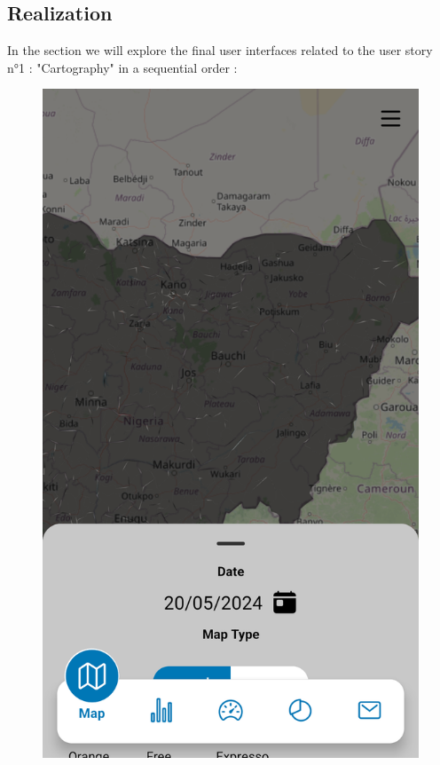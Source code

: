 \subsection{Realization}
In the section we will explore the final user interfaces related to the user story n°1 : "Cartography" in a sequential order :
\begin{figure}[H]
\begin{minipage}{0.32\textwidth}
    \centering
    \includegraphics[width=\linewidth]{images/sprint3/mapModuleInit.png}

\end{minipage}
\end{figure}
